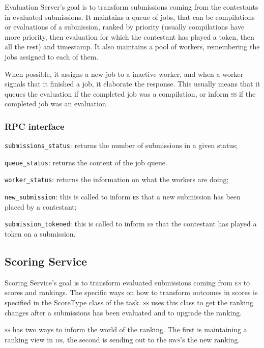 \documentclass[a4paper,8pt]{amsart}
\newcommand{\DB}{\textsc{db}}
\newcommand{\ES}{\textsc{es}}
\renewcommand{\SS}{\textsc{ss}}
\newcommand{\RWS}{\textsc{rws}}
\newenvironment{squishlist}{%
  \begin{list}{\textbullet}%
    { \setlength{\itemsep}{0pt}%
      \setlength{\parsep}{3pt}%
      \setlength{\topsep}{3pt}%
      \setlength{\partopsep}{0pt}%
      \setlength{\leftmargin}{1.5em}%
      \setlength{\labelwidth}{1em}%
      \setlength{\labelsep}{0.5em} }%
}{\end{list}}
\newcommand{\id}[1]{\texttt{#1}}
\begin{document}
\begin{multicols}{2}
  Evaluation Server's goal is to transform submissions coming from the
  contestants in evaluated submissions. It maintains a queue of jobs,
  that can be compilations or evaluations of a submission, ranked by
  priority (usually compilations have more priority, then evaluation
  for which the contestant has played a token, then all the rest) and
  timestamp. It also maintains a pool of workers, remembering the jobs
  assigned to each of them.

  When possible, it assigns a new job to a inactive worker, and when a
  worker signals that it finished a job, it elaborate the
  response. This usually means that it queues the evaluation if the
  completed job was a compilation, or inform \SS{} if the completed
  job was an evaluation.

  \subsubsection{RPC interface}

  \begin{squishlist}
  \item \id{submissions\_status}: returns the number of submissions in
    a given status;
  \item \id{queue\_status}: returns the content of the job queue.
  \item \id{worker\_status}: returns the information on what the
    workers are doing;
  \item \id{new\_submission}: this is called to inform \ES{} that a new
    submission has been placed by a contestant;
  \item \id{submission\_tokened}: this is called to inform \ES{} that
    the contestant has played a token on a submission.
  \end{squishlist}

  \subsection{Scoring Service}

  Scoring Service's goal is to transform evaluated submissions coming
  from \ES{} to scores and rankings. The specific ways on how to
  transform outcomes in scores is specified in the ScoreType class of
  the task. \SS{} uses this class to get the ranking changes after a
  submissions has been evaluated and to upgrade the ranking.

  \SS{} has two ways to inform the world of the ranking. The first is
  maintaining a ranking view in \DB{}, the second is sending out to
  the \RWS{}'s the new ranking.


\end{multicols}
\end{document}
